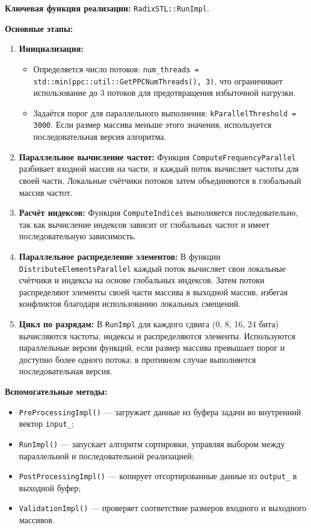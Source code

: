 \documentclass[12pt]{article}
\begin{document}
\textbf{Ключевая функция реализации:} \texttt{RadixSTL::RunImpl}.

\textbf{Основные этапы:}
\begin{enumerate}
  \item \textbf{Инициализация:}
  \begin{itemize}
    \item Определяется число потоков: \texttt{num\_threads = std::min(ppc::util::GetPPCNumThreads(), 3)}, что ограничивает использование до 3 потоков для предотвращения избыточной нагрузки.
    \item Задаётся порог для параллельного выполнения: \texttt{kParallelThreshold = 3000}. Если размер массива меньше этого значения, используется последовательная версия алгоритма.
  \end{itemize}

  \item \textbf{Параллельное вычисление частот:}
  Функция \texttt{ComputeFrequencyParallel} разбивает входной массив на части, и каждый поток вычисляет частоты для своей части. Локальные счётчики потоков затем объединяются в глобальный массив частот.

  \item \textbf{Расчёт индексов:}
  Функция \texttt{ComputeIndices} выполняется последовательно, так как вычисление индексов зависит от глобальных частот и имеет последовательную зависимость.

  \item \textbf{Параллельное распределение элементов:}
  В функции \texttt{DistributeElementsParallel} каждый поток вычисляет свои локальные счётчики и индексы на основе глобальных индексов. Затем потоки распределяют элементы своей части массива в выходной массив, избегая конфликтов благодаря использованию локальных смещений.

  \item \textbf{Цикл по разрядам:}
  В \texttt{RunImpl} для каждого сдвига (0, 8, 16, 24 бита) вычисляются частоты, индексы и распределяются элементы. Используются параллельные версии функций, если размер массива превышает порог и доступно более одного потока; в противном случае выполняется последовательная версия.
\end{enumerate}

\textbf{Вспомогательные методы:}
\begin{itemize}
  \item \texttt{PreProcessingImpl()} — загружает данные из буфера задачи во внутренний вектор \texttt{input\_};
  \item \texttt{RunImpl()} — запускает алгоритм сортировки, управляя выбором между параллельной и последовательной реализацией;
  \item \texttt{PostProcessingImpl()} — копирует отсортированные данные из \texttt{output\_} в выходной буфер;
  \item \texttt{ValidationImpl()} — проверяет соответствие размеров входного и выходного массивов.
\end{itemize}
\end{document}
